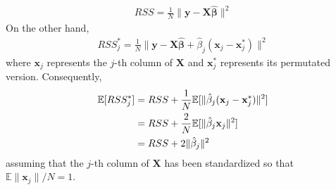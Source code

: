 \begin{exercise}[(Program)]
\end{exercise}

\begin{exercise}
  \begin{align}
    RSS = \frac{1}{N}\|\mathbf{y} - \mathbf{X}\hat{\bm{\beta}}\|^2
  \end{align}
  On the other hand,
  \begin{align}
    RSS_j^* = \frac{1}{N}\|\mathbf{y} - \mathbf{X}\hat{\bm{\beta}} +
    \hat{\beta}_j(\mathbf{x}_j - \mathbf{x}_j^*)\|^2
  \end{align}
  where $\mathbf{x}_j$ represents the $j$-th column of $\mathbf{X}$ and $\mathbf{x}_j^*$
  represents its permutated version. Consequently,
  \begin{align}
    \mathbb{E}[RSS_j^*] &= RSS +
    \frac{1}{N}\mathbb{E}[\|\hat{\beta}_j(\mathbf{x}_j - \mathbf{x}_j^*)\|^2] \notag \\
    &= RSS + \frac{2}{N}\mathbb{E}[\|\hat{\beta}_j\mathbf{x}_j\|^2] \notag \\
    &= RSS + 2\|\hat{\beta}_j\|^2
  \end{align}
  assuming that the $j$-th column of $\mathbf{X}$ has been standardized so that
  $\mathbb{E}\|\mathbf{x}_j\|/N = 1$.
\end{exercise}